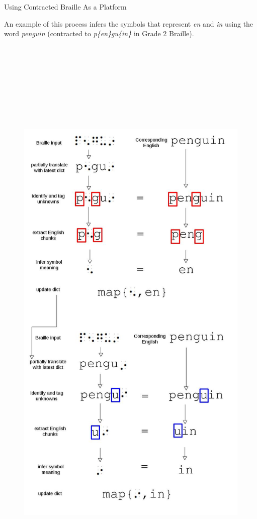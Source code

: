 \documentclass[final]{beamer}
\begin{document}
\begin{frame}{}
\begin{columns}[t]
\begin{column}{.3\linewidth}

\vspace{-50pt}  
   \begin{block}{{\small Using Contracted Braille As a Platform}}
\vspace{-10pt}  
     {\scriptsize
An example of this process infers the symbols that represent \textit{en} and \textit{in} using the word \textit{penguin} (contracted to \textit{p\{en\}gu\{in\}} in Grade 2 Braille).\par}
          \begin{figure}
	\includegraphics[height = 33cm]{penguin-6}
	\end{figure}
      \end{block}


\
\end{column}
\end{columns}
\end{frame}
\end{document}

